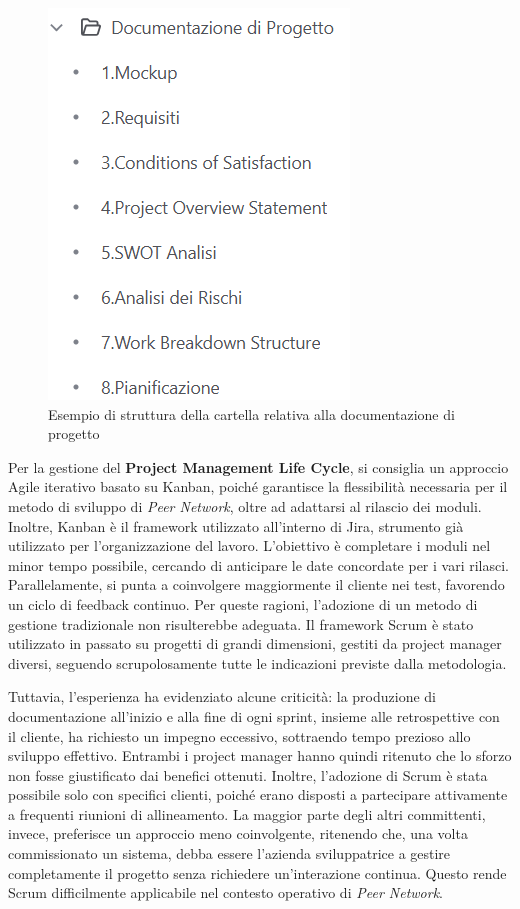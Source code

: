 \begin{figure}
    \centering
    \includegraphics[scale=0.6]{figures/strutturaConfluenceProposta.png}
    \caption{Esempio di struttura della cartella relativa alla documentazione di progetto}
    \label{fig:doc-progetto}
\end{figure}

Per la gestione del \textbf{Project Management Life Cycle}, si consiglia un approccio Agile iterativo basato su Kanban, poiché garantisce
la flessibilità necessaria per il metodo di sviluppo di \textit{Peer Network}, oltre ad adattarsi al rilascio dei moduli.
Inoltre, Kanban è il framework utilizzato all’interno di Jira, strumento già utilizzato per l’organizzazione del lavoro. L’obiettivo è
completare i moduli nel minor tempo possibile, cercando di anticipare le date concordate per i vari rilasci. Parallelamente, si
punta a coinvolgere maggiormente il cliente nei test, favorendo un ciclo di feedback continuo. Per queste ragioni,
l’adozione di un metodo di gestione tradizionale non risulterebbe adeguata. Il framework Scrum è stato utilizzato in passato su progetti di
grandi dimensioni, gestiti da project manager diversi, seguendo scrupolosamente tutte le indicazioni previste dalla metodologia.

Tuttavia, l’esperienza ha evidenziato alcune criticità: la produzione di documentazione all’inizio e alla fine di ogni sprint,
insieme alle retrospettive con il cliente, ha richiesto un impegno eccessivo, sottraendo tempo prezioso allo sviluppo effettivo.
Entrambi i project manager hanno quindi ritenuto che lo sforzo non fosse giustificato dai benefici ottenuti. Inoltre, l’adozione
di Scrum è stata possibile solo con specifici clienti, poiché erano disposti a partecipare attivamente a frequenti riunioni di
allineamento. La maggior parte degli altri committenti, invece, preferisce un approccio meno coinvolgente, ritenendo che, una volta
commissionato un sistema, debba essere l’azienda sviluppatrice a gestire completamente il progetto senza richiedere un’interazione
continua. Questo rende Scrum difficilmente applicabile nel contesto operativo di \textit{Peer Network}.

